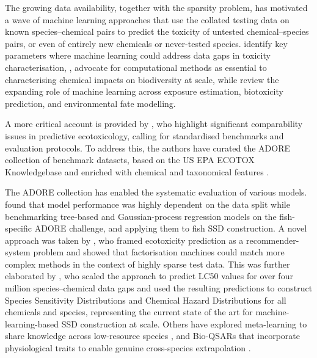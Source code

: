 The growing data availability, together with the sparsity problem, has motivated a wave of machine learning approaches that use the collated testing data on known species--chemical pairs to predict the toxicity of untested chemical--species pairs, or even of entirely new chemicals or never-tested species. \citet{von2023potential} identify key parameters where machine learning could address data gaps in toxicity characterisation, \citet{kosnik2024harnessing}, advocate for computational methods as essential to characterising chemical impacts on biodiversity at scale, while \citet{dong2025machine} review the expanding role of machine learning across exposure estimation, biotoxicity prediction, and environmental fate modelling.

A more critical account is provided by \citet{schur2025comparability}, who highlight significant comparability issues in predictive ecotoxicology, calling for standardised benchmarks and evaluation protocols. To address this, the authors have curated the ADORE collection of benchmark datasets, based on the US EPA ECOTOX Knowledgebase and enriched with chemical and taxonomical features \cite{ADORE}.

The ADORE collection has enabled the systematic evaluation of various models. \citet{gasser2024fish} found that model performance was highly dependent on the data split while benchmarking tree-based and Gaussian-process regression models on the fish-specific ADORE challenge, and applying them to fish SSD construction. A novel approach was taken by \citet{Viljanen2023}, who framed ecotoxicity prediction as a recommender-system problem and showed that factorisation machines could match more complex methods in the context of highly sparse test data. This was further elaborated by \citet{PosthumaImprovingHazard}, who scaled the approach to predict LC50 values for over four million species--chemical data gaps and used the resulting predictions to construct Species Sensitivity Distributions and Chemical Hazard Distributions for all chemicals and species, representing the current state of the art for machine-learning-based SSD construction at scale. Others have explored meta-learning to share knowledge across low-resource species \cite{schlender2023bigger}, and Bio-QSARs that incorporate physiological traits to enable genuine cross-species extrapolation \cite{zubrod2024bio}.

